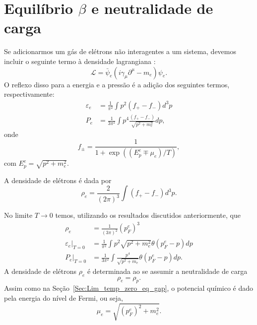\section{Equilíbrio $\beta$ e neutralidade de carga}

Se adicionarmos um gás de elétrons não interagentes a um sistema, devemos incluir o seguinte termo à densidade lagrangiana \parencite{CavagnoliTese}:
\begin{equation}
	\mathcal{L} = \bar\psi_e(i\gamma_\mu\partial^\mu - m_e)\psi_e.
\end{equation}
%
O reflexo disso para a energia e a pressão é a adição dos seguintes termos, respectivamente:
\begin{align}
	\varepsilon_e &= \frac{1}{\pi^2} \int p^2 (f_+ - f_-) d^3p \\
	P_e &= \frac{1}{3\pi^2}\int p^4 \frac{(f_+ - f_-)}{\sqrt{p^2 + m_e^2}} dp,
\end{align}
%
onde
\begin{equation}
	f_{\pm} = \frac{1}{1 + \exp((E_p^e \mp \mu_e)/T)},
\end{equation}
%
com $E_p^e = \sqrt{p^2 + m_e^2}$.

A densidade de elétrons é dada por
\begin{equation}
	\rho_e = \frac{2}{(2\pi)^3}\int (f_+ - f_-) d^3p.
\end{equation}

No limite $T \to 0$ temos, utilizando os resultados discutidos anteriormente, que
\begin{align}
	\rho_e &= \frac{1}{(3\pi)^2} (p_F^e)^3 \\
	\varepsilon_e |_{T = 0} &= \frac{1}{\pi^2} \int p^2 \sqrt{p^2 + m_e^2} \theta(p_F^e - p) dp \\
	P_e|_{T = 0} &= \frac{1}{3\pi^2} \int \frac{p^4}{\sqrt{p^2 + m_e}} \theta(p_F^e - p) dp.
\end{align}
%
A densidade de elétrons $\rho_e$ é determinada ao se assumir a neutralidade de carga
\begin{equation}
	\rho_e = \rho_p.
\end{equation}
%
Assim como na Seção~\ref{Sec:Lim_temp_zero_eq_gap}, o potencial químico é dado pela energia do nível de Fermi, ou seja,
\begin{equation}
	\mu_e = \sqrt{(p_F^e)^2 + m_e^2}.
\end{equation}

